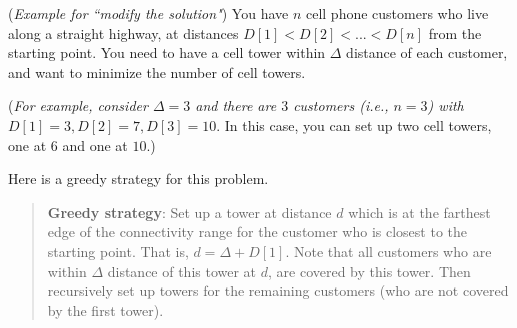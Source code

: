 \documentclass{exam}
\begin{document}
\begin{questions}




\vspace{0.3in}








\question ({\it Example for ``modify the solution"})
You have $n$ cell phone customers who live along a straight highway, at distances $D[1] < D[2] <  ... < D[n]$ from the starting point.  
You need to have a cell tower within $\Delta$ distance of
each customer, and want to minimize the number of cell towers.  

({\it For example, consider $\Delta=3$ and there are $3$ customers  (i.e., $n = 3$) with $D[1] = 3, D[2] = 7, D[3] = 10$}. In this case, you can set up two cell towers, one at $6$ and one at $10$.)

Here is a greedy strategy for this problem.
\begin{quote}
{\bf Greedy strategy}: Set up a tower at distance $d$ which is at the farthest edge of the connectivity range for the customer who is closest to the starting point. That is, $d = \Delta + D[1]$. Note that all customers who are within $\Delta$ distance of this tower at $d$, are covered by this tower. 
Then recursively set up towers for the remaining customers (who are not covered by the first tower).
\end{quote}


\end{questions}
\end{document}
